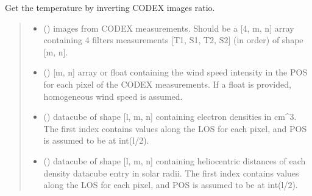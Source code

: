 \documentclass[letterpaper,10pt,english]{sphinxmanual}
\begin{document}
\begin{fulllineitems}
\label{\detokenize{doppler_dimming_lib:doppler_dimming_lib.inversion.invert_temperature_batch}}
\pysigstartsignatures
{}
\pysigstopsignatures
\sphinxAtStartPar
Get the temperature by inverting CODEX images ratio.
\begin{quote}\begin{description}
\begin{itemize}
\item {} 
\sphinxAtStartPar
{} () \textendash{} images from CODEX measurements. Should be a {[}4, m, n{]} array containing 4 filters measurements {[}T1, S1, T2, S2{]} (in order) of shape {[}m, n{]}.

\item {} 
\sphinxAtStartPar
{} () \textendash{} {[}m, n{]} array or float containing the wind speed intensity in the POS for each pixel of the CODEX measurements. If a float is provided, homogeneous wind speed is assumed.

\item {} 
\sphinxAtStartPar
{} () \textendash{} datacube of shape {[}l, m, n{]} containing electron densities in cm\textasciicircum{}\sphinxhyphen{}3. The first index contains values along the LOS for each pixel, and POS is assumed to be at int(l/2).

\item {} 
\sphinxAtStartPar
{} () \textendash{} datacube of shape {[}l, m, n{]} containing heliocentric distances of each density datacube entry in solar radii. The first index contains values along the LOS for each pixel, and POS is assumed to be at int(l/2).


\end{itemize}
\end{description}
\end{quote}
\end{fulllineitems}
\end{document}
